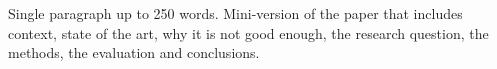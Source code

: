 Single paragraph up to 250 words. Mini-version of the paper that includes context, state of the art, why it is not good enough, the research question, the methods, the evaluation and conclusions.
